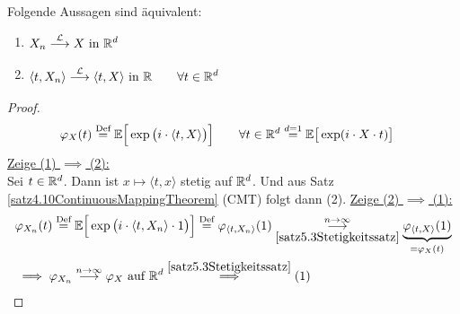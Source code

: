 \begin{satz}\label{satz5.4CramerWoldDevice}\enter
	Folgende Aussagen sind äquivalent:
	\begin{enumerate}[label=(\arabic*)]
		\item $\begin{aligned}
			X_n\stackrel{\mathcal{L}}{\longrightarrow} X\text{ in }\mathbb{R}^d
		\end{aligned}$
		\item $\begin{aligned}
			\langle t, X_n\rangle\stackrel{\mathcal{L}}{\longrightarrow}\langle t, X\rangle\text{ in }\mathbb{R}\qquad\forall t\in\mathbb{R}^d
		\end{aligned}$
	\end{enumerate}
\end{satz}

\begin{proof}
	\begin{align*}
		\varphi_X(t)
		&\stackrel{\text{Def}}{=}\mathbb{E}\Big[\exp\big(i\cdot\langle t,X\rangle\big)\Big]\qquad\forall t\in\mathbb{R}^d
		\stackrel{d=1}{=}\mathbb{E}\big[\exp(i\cdot X\cdot t)\big]
	\end{align*}
	\underline{Zeige (1) $\implies$ (2):}\\
	Sei $t\in\mathbb{R}^d$. Dann ist $x\mapsto\langle t,x\rangle$ stetig auf $\mathbb{R}^d$. 
	Und aus Satz \ref{satz4.10ContinuousMappingTheorem} (CMT) folgt dann (2).\nl
	\underline{Zeige (2) $\implies$ (1):}
	\begin{align*}
		&\varphi_{X_n}(t)
		\stackrel{\text{Def}}{=}\mathbb{E}\Big[\exp\big(i\cdot\langle t,X_n\rangle\cdot 1\big)\Big]
		\stackrel{\text{Def}}{=}\varphi_{\langle t,X_n\rangle}(1)
		\underset{\ref{satz5.3Stetigkeitssatz}}{\overset{n\to\infty}{\longrightarrow}}\underbrace{\varphi_{\langle t,X\rangle}(1)}_{=\varphi_X(t)}\\
		&\implies\varphi_{X_n}\stackrel{n\to\infty}{\longrightarrow}\varphi_X\text{ auf }\mathbb{R}^d
		\stackrel{\ref{satz5.3Stetigkeitssatz}}{\implies}(1)
	\end{align*}
\end{proof}


